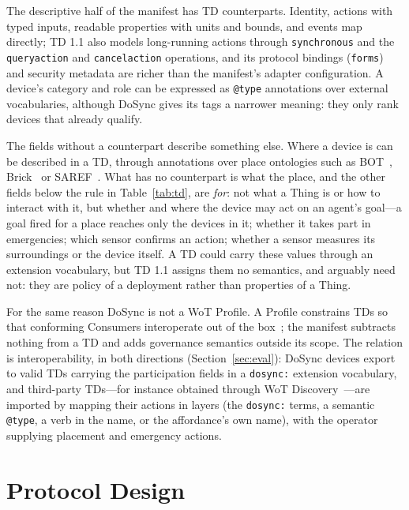 \documentclass[conference]{IEEEtran}
\newcommand{\code}[1]{\texttt{#1}}
\begin{document}
The descriptive half of the manifest has TD counterparts. Identity, actions with typed inputs, readable properties with units and bounds, and events map directly; TD 1.1 also models long-running actions through \code{synchronous} and the \code{queryaction} and \code{cancelaction} operations, and its protocol bindings (\code{forms}) and security metadata are richer than the manifest's adapter configuration. A device's category and role can be expressed as \code{@type} annotations over external vocabularies, although DoSync gives its tags a narrower meaning: they only rank devices that already qualify.

The fields without a counterpart describe something else. Where a device is can be described in a TD, through annotations over place ontologies such as BOT~\cite{bot}, Brick~\cite{brick} or SAREF~\cite{saref}. What has no counterpart is what the place, and the other fields below the rule in Table~\ref{tab:td}, are \emph{for}: not what a Thing is or how to interact with it, but whether and where the device may act on an agent's goal---a goal fired for a place reaches only the devices in it; whether it takes part in emergencies; which sensor confirms an action; whether a sensor measures its surroundings or the device itself. A TD could carry these values through an extension vocabulary, but TD 1.1 assigns them no semantics, and arguably need not: they are policy of a deployment rather than properties of a Thing.

For the same reason DoSync is not a WoT Profile. A Profile constrains TDs so that conforming Consumers interoperate out of the box~\cite{wot-profile}; the manifest subtracts nothing from a TD and adds governance semantics outside its scope. The relation is interoperability, in both directions (Section~\ref{sec:eval}): DoSync devices export to valid TDs carrying the participation fields in a \code{dosync:} extension vocabulary, and third-party TDs---for instance obtained through WoT Discovery~\cite{wot-discovery}---are imported by mapping their actions in layers (the \code{dosync:} terms, a semantic \code{@type}, a verb in the name, or the affordance's own name), with the operator supplying placement and emergency actions.

\section{Protocol Design}
\label{sec:design}
\end{document}
